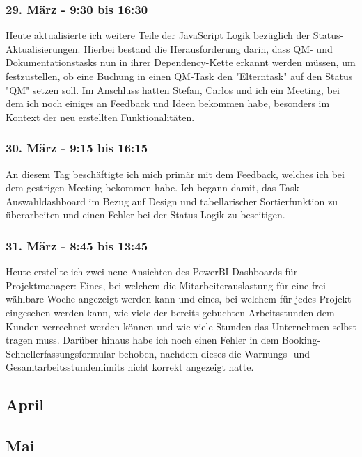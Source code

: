 \subsubsection*{29. März - 9:30 bis 16:30}
Heute aktualisierte ich weitere Teile der JavaScript Logik bezüglich der Status-Aktualisierungen. Hierbei bestand die Herausforderung darin, dass QM- und Dokumentationstasks nun in ihrer Dependency-Kette erkannt werden müssen, um festzustellen, ob eine Buchung in einen QM-Task den "Elterntask" auf den Status "QM" setzen soll. Im Anschluss hatten Stefan, Carlos und ich ein Meeting, bei dem ich noch einiges an Feedback und Ideen bekommen habe, besonders im Kontext der neu erstellten Funktionalitäten.

\subsubsection*{30. März - 9:15 bis 16:15}
An diesem Tag beschäftigte ich mich primär mit dem Feedback, welches ich bei dem gestrigen Meeting bekommen habe. Ich begann damit, das Task-Auswahldashboard im Bezug auf Design und tabellarischer Sortierfunktion zu überarbeiten und einen Fehler bei der Status-Logik zu beseitigen.  

\subsubsection*{31. März - 8:45 bis 13:45}
Heute erstellte ich zwei neue Ansichten des PowerBI Dashboards für Projektmanager: Eines, bei welchem die Mitarbeiterauslastung für eine frei-wählbare Woche angezeigt werden kann und eines, bei welchem für jedes Projekt eingesehen werden kann, wie viele der bereits gebuchten Arbeitsstunden dem Kunden verrechnet werden können und wie viele Stunden das Unternehmen selbst tragen muss. Darüber hinaus habe ich noch einen Fehler in dem Booking-Schnellerfassungsformular behoben, nachdem dieses die Warnungs- und Gesamtarbeitsstundenlimits nicht korrekt angezeigt hatte.  

\subsection{April}

\subsection{Mai}
